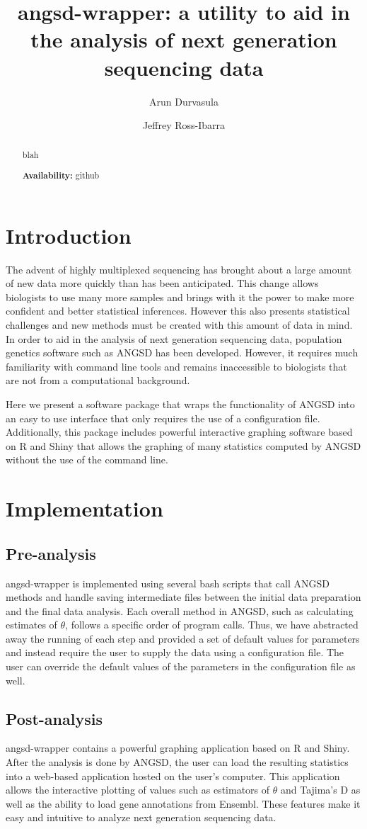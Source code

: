 \documentclass[12pt]{article}
\title{angsd-wrapper: a utility to aid in the analysis of next generation sequencing data}
\author[1]{Arun Durvasula}
\author[1,2]{Jeffrey Ross-Ibarra}
\affil[1]{Department of Plant Sciences, University of California Davis}
\affil[2]{Center for Population Biology and Genome Center, University of California Davis}
\date{}
\begin{document}
\maketitle

\begin{abstract}
blah

\textbf{Availability:} github
\end{abstract}

\section{Introduction}
The advent of highly multiplexed sequencing has brought about a large amount of new data more quickly than has been anticipated. This change allows biologists to use many more samples and brings with it the power to make more confident and better statistical inferences. However this also presents statistical challenges and new methods must be created with this amount of data in mind. In order to aid in the analysis of next generation sequencing data, population genetics software such as ANGSD has been developed. However, it requires much familiarity with command line tools and remains inaccessible to biologists that are not from a computational background. 

Here we present a software package that wraps the functionality of ANGSD into an easy to use interface that only requires the use of a configuration file. Additionally, this package includes powerful interactive graphing software based on R and Shiny that allows the graphing of many statistics computed by ANGSD without the use of the command line.

\section{Implementation}
\subsection*{Pre-analysis}
angsd-wrapper is implemented using several bash scripts that call ANGSD methods and handle saving intermediate files between the initial data preparation and the final data analysis. Each overall method in ANGSD, such as calculating estimates of $\theta$, follows a specific order of program calls. Thus, we have abstracted away the running of each step and provided a set of default values for parameters and instead require the user to supply the data using a configuration file. The user can override the default values of the parameters in the configuration file as well. 
\subsection*{Post-analysis}
angsd-wrapper contains a powerful graphing application based on R and Shiny. After the analysis is done by ANGSD,  the user can load the resulting statistics into a web-based application hosted on the user's computer. This application allows the interactive plotting of values such as estimators of $\theta$ and Tajima's D as well as the ability to load gene annotations from Ensembl. These features make it easy and intuitive to analyze next generation sequencing data.
\end{document}
